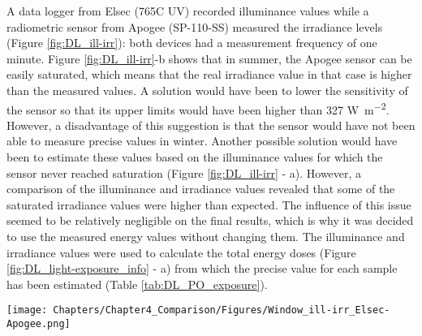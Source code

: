 A data logger from Elsec (765C UV) recorded illuminance values while a radiometric sensor from Apogee (SP-110-SS) measured the irradiance levels (Figure \ref{fig:DL_ill-irr}): both devices had a measurement frequency of one minute. Figure \ref{fig:DL_ill-irr}-b shows that in summer, the Apogee sensor can be easily saturated, which means that the real irradiance value in that case is higher than the measured values. A solution would have been to lower the sensitivity of the sensor so that its upper limits would have been higher than 327 \unit{\watt\per\square\metre}. However, a disadvantage of this suggestion is that the sensor would have not been able to measure precise values in winter. Another possible solution would have been to estimate these values based on the illuminance values for which the sensor never reached saturation (Figure \ref{fig:DL_ill-irr} - a). However, a comparison of the illuminance and irradiance values revealed that some of the saturated irradiance values were higher than expected. The influence of this issue seemed to be relatively negligible on the final results, which is why it was decided to use the measured energy values without changing them. The illuminance and irradiance values were used to calculate the total energy doses (Figure \ref{fig:DL_light-exposure_info} - a) from which the precise value for each sample has been estimated (Table \ref{tab:DL_PO_exposure}). \\

\begin{figure*}[!h]
\centering
\texttt{[image: Chapters/Chapter4\_Comparison/Figures/Window\_ill-irr\_Elsec-Apogee.png]}
\caption[\hspace{0.3cm}Daylight experiments - Light energy values]{Daylight experiments: (a) illuminance values ; (b) irradiance values.}
\label{fig:DL_ill-irr}
\end{figure*}

\vspace{0.5cm}

